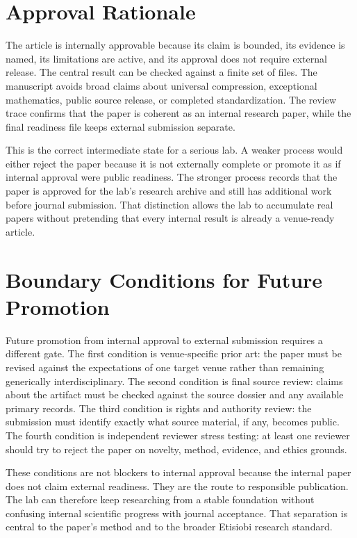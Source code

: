 \documentclass[sigconf,nonacm]{acmart}
\begin{document}
\section{Approval Rationale}
The article is internally approvable because its claim is bounded, its evidence
is named, its limitations are active, and its approval does not require external
release. The central result can be checked against a finite set of files. The
manuscript avoids broad claims about universal compression, exceptional
mathematics, public source release, or completed standardization. The review
trace confirms that the paper is coherent as an internal research paper, while
the final readiness file keeps external submission separate.

This is the correct intermediate state for a serious lab. A weaker process would
either reject the paper because it is not externally complete or promote it as if
internal approval were public readiness. The stronger process records that the
paper is approved for the lab's research archive and still has additional work
before journal submission. That distinction allows the lab to accumulate real
papers without pretending that every internal result is already a venue-ready
article.

\section{Boundary Conditions for Future Promotion}
Future promotion from internal approval to external submission requires a
different gate. The first condition is venue-specific prior art: the paper must
be revised against the expectations of one target venue rather than remaining
generically interdisciplinary. The second condition is final source review:
claims about the artifact must be checked against the source dossier and any
available primary records. The third condition is rights and authority review:
the submission must identify exactly what source material, if any, becomes
public. The fourth condition is independent reviewer stress testing: at least one
reviewer should try to reject the paper on novelty, method, evidence, and ethics
grounds.

These conditions are not blockers to internal approval because the internal
paper does not claim external readiness. They are the route to responsible
publication. The lab can therefore keep researching from a stable foundation
without confusing internal scientific progress with journal acceptance. That
separation is central to the paper's method and to the broader Etisiobi research
standard.
\end{document}
